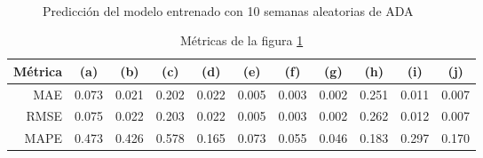 \documentclass[a4paper,10pt]{article}
\begin{document}
\begin{figure}[H]
    \\
  \caption{Predicción del modelo entrenado con 10 semanas aleatorias de ADA}
  \label{f:ada_wk_prophet}
\end{figure}

\begin{table}[H]
 \begin{center}
 \resizebox{12cm}{!} {
  \begin{tabular}{|r|c|c|c|c|c|c|c|c|c|c|}
    Métrica & (a) & (b) & (c) & (d) & (e) & (f) & (g) & (h) & (i) & (j) \\ \hline
    MAE & 0.073& 0.021& 0.202& 0.022& 0.005& 0.003& 0.002& 0.251& 0.011& 0.007\\
    RMSE & 0.075& 0.022& 0.203& 0.022& 0.005& 0.003& 0.002& 0.262& 0.012& 0.007\\
    MAPE & 0.473& 0.426& 0.578& 0.165& 0.073& 0.055& 0.046& 0.183& 0.297& 0.170\\ \hline
  \end{tabular}
  }
  \caption{Métricas de la figura \ref{f:ada_wk_prophet}}
  \label{tab:ada_prophet_wk}
 \end{center}
\end{table}
\end{document}

